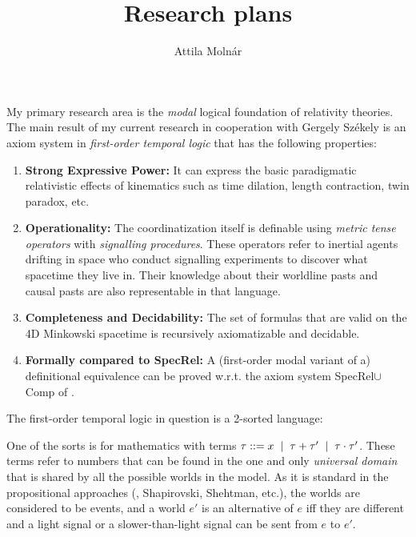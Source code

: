 \documentclass[12pt, a4paper]{article}
\title{Research plans}
\author{Attila Moln\'ar}
\newcommand{\vonal} [1][.2]{\hspace{#1cm} | \hspace{#1cm}}
\begin{document}
\pagestyle{empty}
\maketitle
\thispagestyle{empty}

My primary research area is the \emph{modal} logical foundation of relativity theories. 
The main result of my current research in cooperation with Gergely Sz\'ekely is an axiom system in \emph{first-order temporal logic} that has the following properties:
\begin{enumerate}
\item \textbf{Strong Expressive Power:} It can express the basic paradigmatic relativistic effects of kinematics such as time dilation, length contraction, twin paradox, etc.
\item \textbf{Operationality:} The coordinatization itself is definable using \emph{metric tense operators} with \emph{signalling procedures}. These operators refer to inertial agents drifting in space who conduct signalling experiments to discover what spacetime they live in. Their knowledge about their worldline pasts and causal pasts are also representable in that language.
\item \textbf{Completeness and Decidability:} The set of formulas that are valid on the 4D Minkowski spacetime is recursively axiomatizable and decidable.
\item \textbf{Formally compared to \textsf{SpecRel}:} A (first-order modal variant of a) definitional equivalence can be proved w.r.t. the axiom system \textsf{SpecRel$\cup$Comp} of \cite{logst}.
\end{enumerate}
The first-order temporal logic in question is a 2-sorted language: 

One of the sorts is for mathematics with terms $\tau ::= x\vonal \tau+\tau' \vonal \tau \cdot \tau'$.
These terms refer to numbers that can be found in the one and only \emph{universal domain} that is shared by all the possible worlds in the model.
As it is standard in the propositional approaches (\cite{Goldblatt1980}, Shapirovski, Shehtman, etc.), the worlds are considered to be events, and a world $e'$ is an alternative of $e$ iff they are different and a light signal or a slower-than-light signal can be sent from $e$ to $e'$.
\end{document}
